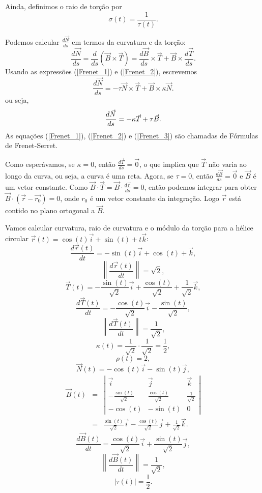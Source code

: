 Ainda, definimos o raio de torção por
$$
\sigma(t)=\frac{1}{\tau(t)}.
$$

Podemos calcular $\frac{d\vec{N}}{ds}$ em termos da curvatura e da torção:
\begin{equation*}
\frac{d\vec{N}}{ds}=\frac{d}{ds}\left(\vec{B}\times\vec{T}\right)=\frac{d\vec{B}}{ds}\times \vec{T}+\vec{B}\times\frac{d\vec{T}}{ds}.
\end{equation*}
Usando as expressões (\ref{Frenet_1}) e (\ref{Frenet_2}), escrevemos
\begin{equation*}
\frac{d\vec{N}}{ds}=-\tau\vec{N} \times \vec{T}+\vec{B}\times \kappa \vec{N}.
\end{equation*}
ou seja,
\begin{equation}{\label{Frenet_3}}
\frac{d\vec{N}}{ds}=-\kappa \vec{T}+\tau \vec{B}.
\end{equation}
As equações (\ref{Frenet_1}), (\ref{Frenet_2}) e (\ref{Frenet_3}) são chamadas de Fórmulas de Frenet-Serret.

Como esperávamos, se $\kappa=0$, então $\frac{d\vec{T}}{ds}=\vec{0}$, o que implica que $\vec{T}$ não varia ao longo da curva, ou seja, a curva é uma reta. Agora, se $\tau=0$, então $\frac{d\vec{B}}{ds}=\vec{0}$ e $\vec{B}$ é um vetor constante. Como $\vec{B}\cdot \vec{T}=\vec{B}\cdot \frac{d\vec{r}}{ds}=0$, então podemos integrar para obter $\vec{B}\cdot (\vec{r}-\vec{r_0})=0$, onde $r_0$ é um vetor constante da integração. Logo $\vec{r}$ está contido no plano ortogonal a $\vec{B}$.



\begin{ex} Vamos calcular curvatura, raio de curvatura e o módulo da torção para a hélice circular $\vec{r}(t)=\cos(t)\vec{i}+\sin(t)+t\vec{k}$:
$$
\frac{d\vec{r}(t)}{dt}=-\sin(t)\vec{i}+\cos(t)+\vec{k},
$$
$$
\left\|\frac{d\vec{r}(t)}{dt}\right\|=\sqrt{2},
$$
$$
\vec{T}(t)=-\frac{\sin(t)}{\sqrt{2}}\vec{i}+\frac{\cos(t)}{\sqrt{2}}+\frac{1}{\sqrt{2}}\vec{k},
$$
$$
\frac{d\vec{T}(t)}{dt}=-\frac{\cos(t)}{\sqrt{2}}\vec{i}-\frac{\sin(t)}{\sqrt{2}},
$$
$$
\left\|\frac{d\vec{T}(t)}{dt}\right\|=\frac{1}{\sqrt{2}},
$$
$$
\kappa(t)=\frac{1}{\sqrt{2}}\cdot \frac{1}{\sqrt{2}}=\frac{1}{2},
$$
$$
\rho(t)=2,
$$
$$
\vec{N}(t)=-\cos(t)\vec{i}-\sin(t)\vec{j},
$$
\begin{eqnarray*}
\vec{B}(t)&=&\left|\begin{array}{ccc}\vec{i}&\vec{j}&\vec{k}\\-\frac{\sin(t)}{\sqrt{2}}&\frac{\cos(t)}{\sqrt{2}}&\frac{1}{\sqrt{2}}\\-\cos(t)&-\sin(t)&0\end{array}\right|\\
&=&\frac{\sin(t)}{\sqrt{2}}\vec{i}-\frac{\cos(t)}{\sqrt{2}}\vec{j}+\frac{1}{\sqrt{2}}\vec{k}.
\end{eqnarray*}
$$
\frac{d\vec{B}(t)}{dt}=\frac{\cos(t)}{\sqrt{2}}\vec{i}+\frac{\sin(t)}{\sqrt{2}}\vec{j},
$$
$$
\left\|\frac{d\vec{B}(t)}{dt}\right\|=\frac{1}{\sqrt{2}},
$$
$$
|\tau(t)|=\frac{1}{2}.
$$
\end{ex}

